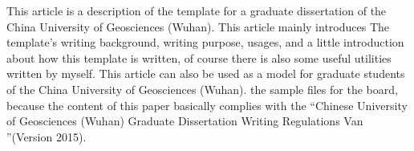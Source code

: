 This article is a description of the \LaTeXe{} template for a graduate dissertation of the 
China University of Geosciences (Wuhan). 
This article mainly introduces
The template's writing background, writing purpose, usages, and a little introduction about 
how this template is written, of course there is also some useful utilities written by myself.
This article can also be used as a \LaTeXe{} model for graduate students of the China University of Geosciences (Wuhan).
the sample files for the board, because the content of this paper basically complies 
with the ``Chinese University of Geosciences (Wuhan) Graduate Dissertation Writing Regulations
Van ''(Version 2015).

\endinput